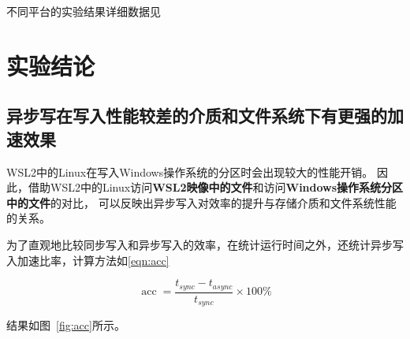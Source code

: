 \documentclass[a4paper,twoside]{article}
\begin{document}
\begin{spacing}{1.2}
不同平台的实验结果详细数据见

\section{实验结论}

\subsection{异步写在写入性能较差的介质和文件系统下有更强的加速效果}

WSL2中的Linux在写入Windows操作系统的分区时会出现较大的性能开销\cite{githubwsl2Filesystem}。
因此，借助WSL2中的Linux访问\textbf{WSL2映像中的文件}和访问\textbf{Windows操作系统分区中的文件}的对比，
可以反映出异步写入对效率的提升与存储介质和文件系统性能的关系。

为了直观地比较同步写入和异步写入的效率，在统计运行时间之外，还统计异步写入加速比率，计算方法如\eqref{eqn:acc}

\begin{equation}
	\label{eqn:acc}
	\mathop{\mathrm{acc}}=\frac{t_{sync}-t_{async}}{t_{sync}} \times 100\%
\end{equation}

结果如图~\ref{fig:acc}所示。


\end{spacing}
\end{document}
